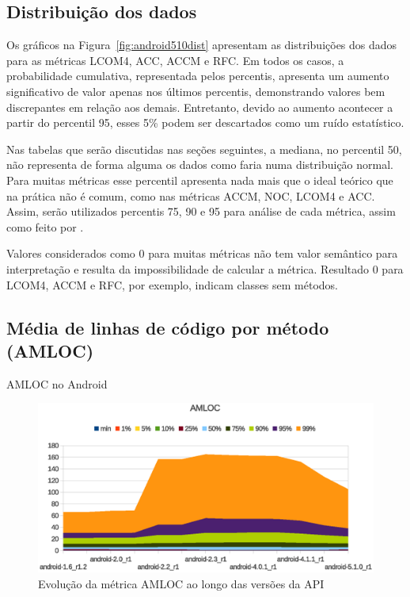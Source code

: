 \subsection{Distribuição dos dados}

Os gráficos na Figura~\ref{fig:android510dist} apresentam as distribuições dos dados para as métricas LCOM4, ACC, ACCM e RFC. Em todos os casos, a probabilidade cumulativa, representada pelos percentis, apresenta um aumento significativo de valor apenas nos últimos percentis, demonstrando valores bem discrepantes em relação aos demais. Entretanto, devido ao aumento acontecer a partir do percentil 95, esses 5\% podem ser descartados como um ruído estatístico. 

Nas tabelas que serão discutidas nas seções seguintes, a mediana, no percentil 50, não representa de forma alguma os dados como faria numa distribuição normal. Para muitas métricas esse percentil apresenta nada mais que o ideal teórico que na prática não é comum, como nas métricas ACCM, NOC, LCOM4 e ACC. Assim, serão utilizados percentis 75, 90 e 95 para análise de cada métrica, assim como feito por .

Valores considerados como 0 para muitas métricas não tem valor semântico para interpretação e resulta da impossibilidade de calcular a métrica. Resultado 0 para LCOM4, ACCM e RFC, por exemplo, indicam classes sem métodos.

\subsection{Média de linhas de código por método (AMLOC)}

\begin{table}[!htb]
\centering
{}

\caption{AMLOC no Android}
\label{tab:amloc_android}
\end{table}

\begin{figure}[!htb]
\centering
\includegraphics [keepaspectratio=true,scale=0.85]{figuras/graphs/amloc_android.eps}
\caption{Evolução da métrica AMLOC ao longo das versões da API}
\label{fig:amloc_android}
\end{figure}

